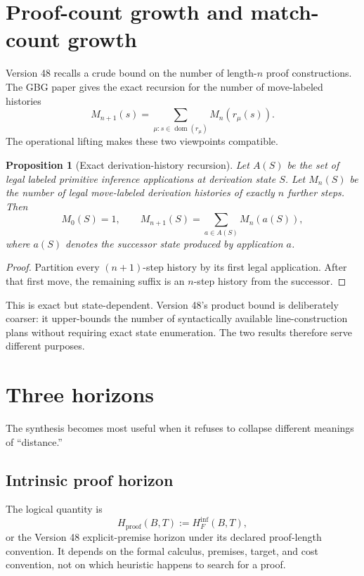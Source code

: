 \documentclass[11pt]{article}
\newtheorem{proposition}[definition]{Proposition}
\theoremstyle{remark}
\newcommand{\dom}{\operatorname{dom}}
\begin{document}
\section{Proof-count growth and match-count growth}

Version 48 recalls a crude bound on the number of length-$n$ proof constructions. The GBG paper gives the exact recursion for the number of move-labeled histories
\[
M_{n+1}(s)=\sum_{\mu:s\in\dom(r_\mu)}M_n(r_\mu(s)).
\]
The operational lifting makes these two viewpoints compatible.

\begin{proposition}[Exact derivation-history recursion]
Let $A(S)$ be the set of legal labeled primitive inference applications at derivation state $S$. Let $M_n(S)$ be the number of legal move-labeled derivation histories of exactly $n$ further steps. Then
\[
M_0(S)=1,
\qquad
M_{n+1}(S)=\sum_{a\in A(S)}M_n(a(S)),
\]
where $a(S)$ denotes the successor state produced by application $a$.
\end{proposition}

\begin{proof}
Partition every $(n+1)$-step history by its first legal application. After that first move, the remaining suffix is an $n$-step history from the successor.
\end{proof}

This is exact but state-dependent. Version 48's product bound is deliberately coarser: it upper-bounds the number of syntactically available line-construction plans without requiring exact state enumeration. The two results therefore serve different purposes.

\section{Three horizons}

The synthesis becomes most useful when it refuses to collapse different meanings of ``distance.''

\subsection{Intrinsic proof horizon}

The logical quantity is
\[
H_{\mathrm{proof}}(B,T):=H_F^{\mathrm{inf}}(B,T),
\]
or the Version 48 explicit-premise horizon under its declared proof-length convention. It depends on the formal calculus, premises, target, and cost convention, not on which heuristic happens to search for a proof.
\end{document}
